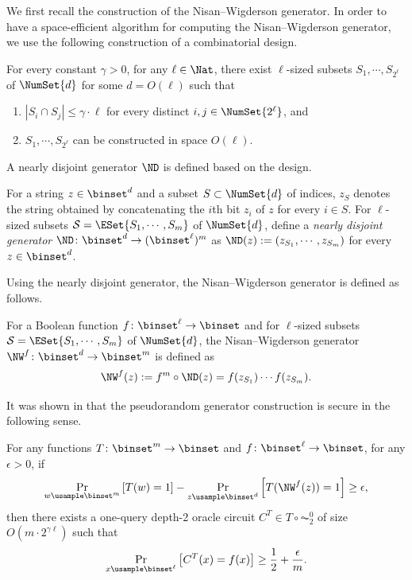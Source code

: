 \documentclass{toc}
\begin{document}
We first recall the construction of the Nisan--Wigderson generator.
In order to have
a space-efficient algorithm for computing the Nisan--Wigderson generator,
we use the following construction of a combinatorial design.
\begin{lemma}
  \label{lemma_design}
  For every constant $\gamma > 0$, for any $\ell \in \Nat$,
  there exist $\ell$-sized subsets $S_1, \cdots, S_{2^\ell}$ of $\NumSet{d}$ for some $d = O(\ell)$
  such that
  \begin{enumerate}
    \item
          $|S_i \cap S_j| \le \gamma \cdot \ell$ for every distinct $i, j \in \NumSet{2^\ell}$, and
    \item
          $S_1, \cdots, S_{2^\ell}$ can be constructed in space $O(\ell)$.
  \end{enumerate}
\end{lemma}

A nearly disjoint generator $\ND$ is defined based on the design.
\begin{definition}
  \label{def_NDgenerator}
  For a string $z \in \binset^d$ and a subset $S \subset \NumSet{d}$ of indices,
  $z_S$ denotes the string obtained by concatenating the $i$th bit $z_i$ of $z$ for every $i \in S$.
  For $\ell$-sized subsets $\mathcal{S} = \ESet{S_1, \cdots, S_{m}}$ of $\NumSet{d}$, define
  a \emph{nearly disjoint generator} $\ND \colon \binset^d \to (\binset^\ell)^m$ as
  $\ND(z) := (z_{S_1}, \cdots, z_{S_m})$ for every $z \in \binset^d$.
\end{definition}
%

Using the nearly disjoint generator, the Nisan--Wigderson generator is defined as follows.
\begin{definition}
  \label{def_NWgenerator}
  For a Boolean function $f \colon \binset^\ell \to \binset$ and
  for $\ell$-sized subsets $\mathcal{S} = \ESet{S_1, \cdots, S_{m}}$ of $\NumSet{d}$,
  the Nisan--Wigderson generator $\NW^f \colon \binset^d \to \binset^m$ is defined as
  $$\NW^f(z) := f^{m} \circ \ND (z) = f(z_{S_1}) \cdots f(z_{S_m}).$$
\end{definition}

It was shown in \cite{NisanW94_jcss_journals}
that the pseudorandom generator construction is secure in the following sense.

\begin{lemma}
  \label{lemma_SecurityOfNW}
  For any functions $T \colon \binset^m \to \binset$ and $f \colon \binset^\ell \to \binset$, for any $\epsilon > 0$,
  if
  $$
    \Pr_{w \usample \binset^m} \left[ T(w) = 1 \right] - \Pr_{z \usample \binset^d} \left[ T(\NW^f(z)) = 1 \right] \ge \epsilon,
  $$
  then
  there exists a one-query depth-2 oracle circuit $C^T \in T \circ \AC^0_2$ of size $O(m \cdot 2^{\gamma \ell})$
  such that
  $$
    \Pr_{x \usample \binset^\ell} \left[ C^T(x) = f(x) \right] \ge \frac{1}{2} + \frac{\epsilon}{m}.
  $$
\end{lemma}
\end{document}
